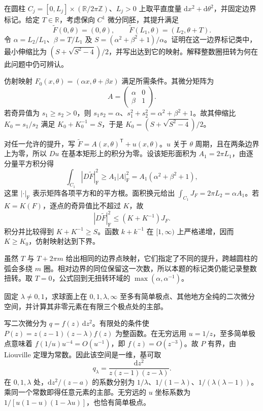 \begin{exercise}
	在圆柱 \(C_j=[0,L_j]\times(\mathbb R/2\pi\mathbb Z)\)、\(L_j>0\) 上取平直度量 \(\mathrm{d}x^2+\mathrm{d}\theta^2\)，并固定边界标记。给定 \(T\in\mathbb R\)，考虑保向 \(C^1\) 微分同胚，其提升满足
	\[
		\widetilde F(0,\theta)=(0,\theta),\qquad
		\widetilde F(L_1,\theta)=(L_2,\theta+T).
	\]
	令 \(\alpha=L_2/L_1\)、\(\beta=T/L_1\) 及 \(S=(\alpha^2+\beta^2+1)/\alpha\)。证明在这一边界标记类中，最小伸缩比为 \((S+\sqrt{S^2-4})/2\)，并写出达到它的映射。解释整数圈扭转为何在此问题中仍可辨认。
\end{exercise}
\begin{solution}
	仿射映射 \(F_0(x,\theta)=(\alpha x,\theta+\beta x)\) 满足所需条件。其微分矩阵为
	\[
		A=\begin{pmatrix}\alpha&0\\\beta&1\end{pmatrix}.
	\]
	若奇异值为 \(s_1\ge s_2>0\)，则 \(s_1s_2=\alpha\)、\(s_1^2+s_2^2=\alpha^2+\beta^2+1\)。故其伸缩比 \(K_0=s_1/s_2\) 满足 \(K_0+K_0^{-1}=S\)，于是 \(K_0=(S+\sqrt{S^2-4})/2\)。

	对任一允许的提升，写 \(\widetilde F=A(x,\theta)^{\mathsf T}+u(x,\theta)\)。\(u\) 关于 \(\theta\) 周期，且在两条边界上为零，所以 \(Du\) 在基本矩形上的积分为零。设该矩形面积为 \(A_1=2\pi L_1\)，由逐分量平方积分得
	\[
		\int_{C_1}|D\widetilde F|_{\mathrm F}^2\ge A_1|A|_{\mathrm F}^2
		=A_1(\alpha^2+\beta^2+1),
	\]
	这里 \(|\cdot|_{\mathrm F}\) 表示矩阵各项平方和的平方根。面积换元给出 \(\int_{C_1}J_F=2\pi L_2=\alpha A_1\)。若 \(K=K(F)\)，逐点的奇异值比不超过 \(K\)，故
	\[
		|D\widetilde F|_{\mathrm F}^2\le(K+K^{-1})J_F.
	\]
	积分并比较得到 \(K+K^{-1}\ge S\)。函数 \(k+k^{-1}\) 在 \([1,\infty)\) 上严格递增，因而 \(K\ge K_0\)，仿射映射达到下界。

	虽然 \(T\) 与 \(T+2\pi m\) 给出相同的边界点映射，它们指定了不同的提升，跨越圆柱的弧会多绕 \(m\) 圈。相对边界的同位保留这一次数，所以本题的标记类仍能记录整数扭转。取 \(T=0\)，公式回到无扭转环域的 \(\max(\alpha,\alpha^{-1})\)。
\end{solution}

\begin{exercise}
	固定 \(\lambda\ne0,1\)，求球面上在 \(0,1,\lambda,\infty\) 至多有简单极点、其他地方全纯的二次微分空间，并计算其非零元素在有限三个极点处的主部。
\end{exercise}
\begin{solution}
	写二次微分为 \(q=f(z)\,\mathrm{d}z^2\)。有限处的条件使 \(P(z)=z(z-1)(z-\lambda)f(z)\) 为整函数。在无穷远用 \(u=1/z\)，至多简单极点意味着 \(f(1/u)u^{-4}=O(u^{-1})\)，即 \(f(z)=O(z^{-3})\)。故 \(P\) 有界，由 Liouville 定理为常数。因此该空间是一维，基可取
	\[
		q_\lambda=\frac{\mathrm{d}z^2}{z(z-1)(z-\lambda)}.
	\]
	在 \(0,1,\lambda\) 处，\(\mathrm{d}z^2/(z-a)\) 的系数分别为 \(1/\lambda\)、\(1/(1-\lambda)\)、\(1/(\lambda(\lambda-1))\)。乘同一个常数即得任意元素的主部。无穷远的 \(u\) 坐标系数为 \(1/[u(1-u)(1-\lambda u)]\)，也恰有简单极点。
\end{solution}

